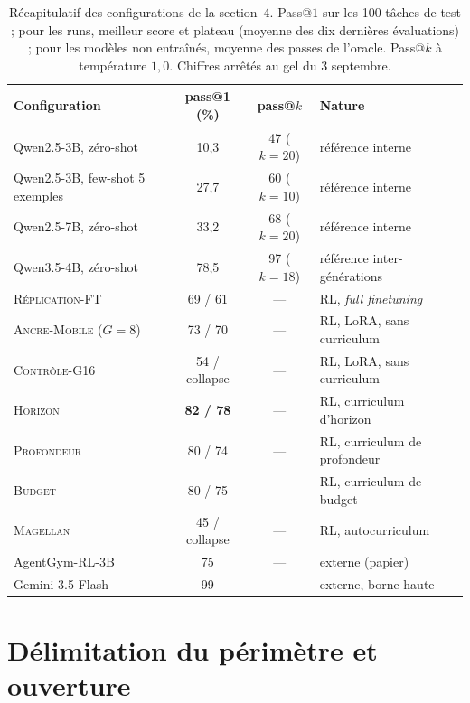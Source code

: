 \documentclass[11pt,a4paper]{article}
\begin{document}
\begin{table}[htbp]
\centering
\caption{Récapitulatif des configurations de la section~4. Pass@$1$ sur les 100 tâches de test ; pour les runs, meilleur score et plateau (moyenne des dix dernières évaluations) ; pour les modèles non entraînés, moyenne des passes de l'oracle. Pass@$k$ à température $1{,}0$. Chiffres arrêtés au gel du 3 septembre.}
\label{tab:recap_section4}
\small
\begin{tabular}{l c c l}
\toprule
\textbf{Configuration} & \textbf{pass@1 (\%)} & \textbf{pass@$k$} & \textbf{Nature} \\
\midrule
Qwen2.5-3B, zéro-shot & 10{,}3 & 47 ($k{=}20$) & référence interne \\
Qwen2.5-3B, few-shot 5 exemples & 27{,}7 & 60 ($k{=}10$) & référence interne \\
Qwen2.5-7B, zéro-shot & 33{,}2 & 68 ($k{=}20$) & référence interne \\
Qwen3.5-4B, zéro-shot & 78{,}5 & 97 ($k{=}18$) & référence inter-générations \\
\textsc{Réplication-FT} & 69 / 61 & --- & RL, \emph{full finetuning} \\
\textsc{Ancre-Mobile} ($G{=}8$) & 73 / 70 & --- & RL, LoRA, sans curriculum \\
\textsc{Contrôle-G16} & 54 / collapse & --- & RL, LoRA, sans curriculum \\
\textsc{Horizon} & \textbf{82 / 78} & --- & RL, curriculum d'horizon \\
\textsc{Profondeur} & 80 / 74 & --- & RL, curriculum de profondeur \\
\textsc{Budget} & 80 / 75 & --- & RL, curriculum de budget \\
\textsc{Magellan} & 45 / collapse & --- & RL, autocurriculum \\
AgentGym-RL-3B & 75 & --- & externe (papier) \\
Gemini 3.5 Flash & 99 & --- & externe, borne haute \\
\bottomrule
\end{tabular}
\end{table}













\clearpage
\section{Délimitation du périmètre et ouverture}
\end{document}
